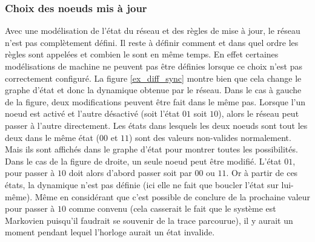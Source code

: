 \documentclass[11pt, a4paper]{article}
\begin{document}
\subsubsection{Choix des noeuds mis à jour}
Avec une modélisation de l'état du réseau et des règles de mise à jour, le
réseau n'est pas complètement défini. Il reste à définir comment et dans quel
ordre les règles sont appelées et combien le sont en même temps. En effet
certaines modélisations de machine ne peuvent pas être définies lorsque ce
choix n'est pas correctement configuré. La figure \ref{ex_diff_sync} montre
bien que cela change le graphe d'état et donc la dynamique obtenue par le
réseau. Dans le cas à gauche de la figure, deux modifications peuvent être fait
dans le même pas.  Lorsque l'un noeud est activé et l'autre désactivé (soit
l'état $01$ soit $10$), alors le réseau peut passer à l'autre directement. Les
états dans lesquels les deux noeuds sont tout les deux dans le même état ($00$
et $11$) sont des valeurs non-valides normalement. Mais ils sont affichés dans
le graphe d'état pour montrer toutes les possibilités. Dans le cas de la figure
de droite, un seule noeud peut être modifié. L'état $01$, pour passer à $10$
doit alors d'abord passer soit par $00$ ou $11$. Or à partir de ces états, la
dynamique n'est pas définie (ici elle ne fait que boucler l'état sur lui-même).
Même en considérant que c'est possible de conclure de la prochaine valeur pour
passer à $10$ comme convenu (cela casserait le fait que le système est
Markovien puisqu'il faudrait se souvenir de la trace parcourue), il y aurait un
moment pendant lequel l'horloge aurait un état invalide.
\end{document}
